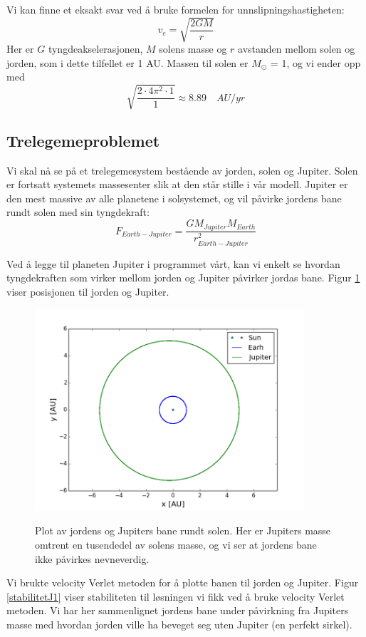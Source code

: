 \documentclass[11pt,a4paper]{article}
\begin{document}
\FloatBarrier

Vi kan finne et eksakt svar ved å bruke formelen for unnslipningshastigheten:
\[v_e = \sqrt{\frac{2GM}{r}} \]
Her er $G$ tyngdeakselerasjonen, $M$ solens masse og $r$ avstanden mellom solen og jorden, som i dette tilfellet er 1 AU. Massen til solen er $M_{\odot}$ = 1, og vi ender opp med
\[\sqrt{ \frac{2 \cdot 4\pi^2 \cdot 1 }{1}  } \approx 8.89 \quad AU/yr \]

\subsection{Trelegemeproblemet}
Vi skal nå se på et trelegemesystem bestående av jorden, solen og Jupiter. Solen er fortsatt systemets massesenter slik at den står stille i vår modell. Jupiter er den mest massive av alle planetene i solsystemet, og vil påvirke jordens bane rundt solen med sin tyngdekraft:
\[F_{Earth-Jupiter} = \frac{GM_{Jupiter}M_{Earth}}{r^2_{Earth-Jupiter}} \]

Ved å legge til planeten Jupiter i programmet vårt, kan vi enkelt se hvordan  tyngdekraften som virker mellom jorden og Jupiter påvirker jordas bane. Figur \ref{jupiterx1} viser posisjonen til jorden og Jupiter.

\FloatBarrier
\begin{figure}[!ht]
\begin{center}
  \includegraphics[width = 100mm]{jupiterx1.png}\\
  \caption{Plot av jordens og Jupiters bane rundt solen. Her er Jupiters masse omtrent en tusendedel av solens masse, og vi ser at jordens bane ikke påvirkes nevneverdig.}   \label{jupiterx1}
  \end{center}
  \end{figure}
\FloatBarrier

Vi brukte velocity Verlet metoden for å plotte banen til jorden og Jupiter. Figur \ref{stabilitetJ1} viser stabiliteten til løsningen vi fikk ved å bruke velocity Verlet metoden. Vi har her sammenlignet jordens bane under påvirkning fra Jupiters masse med hvordan jorden ville ha beveget seg uten Jupiter (en perfekt sirkel). \\
\end{document}
